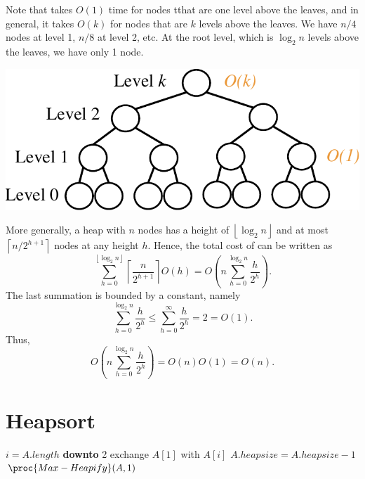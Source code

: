{
    \setlength\columnsep{4em}
    \begin{multicols}{2}
        
        Note that  takes $O(1)$ time for nodes tthat are one level above the leaves, and in general, it takes $O(k)$ for nodes that are $k$ levels above the leaves.
        We have $n / 4$ nodes at level 1, $n / 8$ at level 2, etc. At the root level, which is $\log_2 n$ levels above the leaves, we have only 1 node.

        \includegraphics[width=\linewidth]{figures/build_max_heap.pdf}
    \end{multicols}
}

More generally, a heap with $n$ nodes has a height of $\left\lfloor \log_2 n \right\rfloor$ and at most $\left\lceil n / 2^{h+1} \right\rceil $ nodes at any height $h$. Hence, the total cost of  can be written as
\[
\sum_{h=0}^{\left\lfloor \log_2 n \right\rfloor} \left\lceil \frac{n}{2^{h+1}} \right\rceil O(h) = O \left( n \sum_{h=0}^{\log_2 n} \frac{h}{2^h} \right)
.\]
The last summation is bounded by a constant, namely
\[
\sum_{h=0}^{\log_2 n} \frac{h}{2^h} \leq \sum_{h=0}^{\infty} \frac{h}{2^h} = 2 = O(1)
.\]
Thus,
\[
O \left( n \sum_{h=0}^{\log_2 n} \frac{h}{2^h} \right) = O(n) O(1) = O(n)
.\]

\section{Heapsort}

\begin{codebox}
    \li \For $i = A.length$ \textbf{downto} 2
    \li \Then exchange $A[1]$ with $A[i]$
    \li $A.heapsize = A.heapsize - 1$
    \li $\proc{Max-Heapify}(A,1)$
    \End 
\end{codebox}